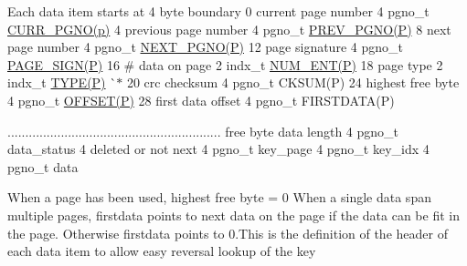 Each data item starts at 4 byte boundary 0 current page number 4 pgno\+\_\+t \mbox{\hyperlink{adat-devel_2other__libs_2filedb_2filehash_2ffdb__page_8h_a457153d6443527e77cf6c014418b3f0c}{C\+U\+R\+R\+\_\+\+P\+G\+N\+O(p)}} 4 previous page number 4 pgno\+\_\+t \mbox{\hyperlink{adat-devel_2other__libs_2filedb_2filehash_2ffdb__page_8h_a9f3ec51602d190743b13ac9322bea011}{P\+R\+E\+V\+\_\+\+P\+G\+N\+O(\+P)}} 8 next page number 4 pgno\+\_\+t \mbox{\hyperlink{adat-devel_2other__libs_2filedb_2filehash_2ffdb__page_8h_af1b39c2678bf46751c0a27214c45ac06}{N\+E\+X\+T\+\_\+\+P\+G\+N\+O(\+P)}} 12 page signature 4 pgno\+\_\+t \mbox{\hyperlink{adat-devel_2other__libs_2filedb_2filehash_2ffdb__page_8h_ae3a4cc6ec4e8e6abdeb46e9bc3746a00}{P\+A\+G\+E\+\_\+\+S\+I\+G\+N(\+P)}} 16 \# data on page 2 indx\+\_\+t \mbox{\hyperlink{adat-devel_2other__libs_2filedb_2filehash_2ffdb__page_8h_a2c1f890bf697f759dd5f4d7543d3d581}{N\+U\+M\+\_\+\+E\+N\+T(\+P)}} 18 page type 2 indx\+\_\+t \mbox{\hyperlink{adat-devel_2other__libs_2filedb_2filehash_2ffdb__page_8h_aa26538940485245e2d25f34c9438d924}{T\+Y\+P\+E(\+P)}} \`{}$\ast$ 20 crc checksum 4 pgno\+\_\+t C\+K\+S\+U\+M(\+P) 24 highest free byte 4 pgno\+\_\+t \mbox{\hyperlink{adat-devel_2other__libs_2filedb_2filehash_2ffdb__page_8h_a4dbf6956d979a56c436126902acd9f6d}{O\+F\+F\+S\+E\+T(\+P)}} 28 first data offset 4 pgno\+\_\+t F\+I\+R\+S\+T\+D\+A\+T\+A(\+P)

............................................................ free byte data length 4 pgno\+\_\+t data\+\_\+status 4 deleted or not next 4 pgno\+\_\+t key\+\_\+page 4 pgno\+\_\+t key\+\_\+idx 4 pgno\+\_\+t data

When a page has been used, highest free byte = 0 When a single data span multiple pages, firstdata points to next data on the page if the data can be fit in the page. Otherwise firstdata points to 0.\+This is the definition of the header of each data item to allow easy reversal lookup of the key \mbox{\label{adat-devel_2other__libs_2filedb_2filehash_2ffdb__page_8h_a47f6ae31f5bca8fea23387203e9b43f0}} 
